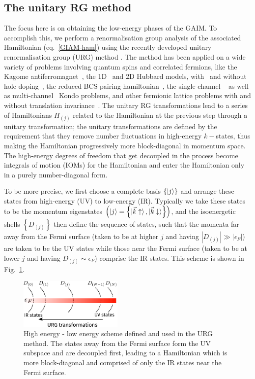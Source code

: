 \documentclass[reprint,superscriptaddress,floatfix]{revtex4-2}
\begin{document}
\subsection{The unitary RG method}
The focus here is on obtaining the low-energy phases of the GAIM. To accomplish this, we perform a renormalisation group analysis of the associated Hamiltonian (eq.~\ref{GIAM-ham}) using the recently developed unitary renormalisation group (URG) method \cite{anirbanurg1,anirbanurg2}. The method has been applied on a wide variety of problems involving quantum spins and correlated fermions, like the Kagome antiferromagnet~\cite{santanukagome}, the 1D~\cite{1dhubjhep} and 2D Hubbard models, with~\cite{anirbanmott2} and without hole doping~\cite{anirbanmott1}, the reduced-BCS pairing hamiltonian~\cite{siddharthacpi}, the single-channel ~\cite{anirban_kondo} as well as multi-channel~\cite{patra_mck} Kondo problems, and other fermionic lattice problems with and without translation invariance~\cite{anirbanurg1,anirbanurg2}. The unitary RG transformations lead to a series of Hamiltonians \(H_{(j)}\) related to the Hamiltonian at the previous step through a unitary transformation; the unitary transformations are defined by the requirement that they remove number fluctuations in high-energy \(k-\)states, thus making the Hamiltonian progressively more block-diagonal in momentum space. The high-energy degrees of freedom that get decoupled in the process become integrals of motion (IOMs) for the Hamiltonian and enter the Hamiltonian only in a purely number-diagonal form.

To be more precise, we first choose a complete basis \(\left\{ \ket{j} \right\} \) and arrange these states from high-energy (UV) to low-energy (IR). Typically we take these states to be the momentum eigenstates \(\left(\ket{j} = \left\{\ket{\vec k \uparrow}, \ket{\vec k \downarrow}\right\}\right)\), and the isoenergetic shells \(\left\{D_{(j)}\right\}\) then define the sequence of states, such that the momenta far away from the Fermi surface (taken to be at higher \(j\) and having \(|D_{(j)}| \gg |\epsilon_F|\)) are taken to be the UV states while those near the Fermi surface (taken to be at lower \(j\) and having \(D_{(j)} \sim \epsilon_F\)) comprise the IR states. This scheme is shown in Fig.~\ref{urg-scheme}.

\begin{figure}[!htb]
	\centering
	\includegraphics[width=0.45\textwidth]{urg-scheme.pdf}
	\caption{High energy - low energy scheme defined and used in the URG method. The states away from the Fermi surface form the UV subspace and are decoupled first, leading to a Hamiltonian which is more block-diagonal and comprised of only the IR states near the Fermi surface.}
	\label{urg-scheme}
\end{figure}
\end{document}
